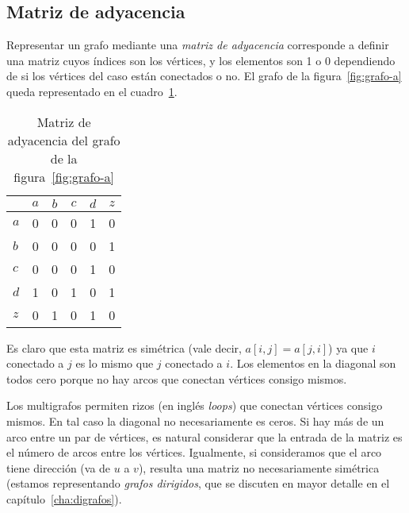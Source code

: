 \subsection{Matriz de adyacencia}
\label{sec:matriz-adyacencia}

  Representar un grafo mediante una \emph{matriz de adyacencia}
  corresponde a definir una matriz cuyos índices son los vértices,
  y los elementos son 1 o 0 dependiendo de si los vértices del caso
  están conectados o no.
  El grafo de la figura~\ref{fig:grafo-a}
  queda representado en el cuadro~\ref{tab:ma-grafo-a}.
  \begin{table}[htbp]
    \centering
    \begin{tabular}{l|*{5}{c}}
	  & $a$ & $b$ & $c$ & $d$ & $z$ \\
      \hline
	\rule[-0.7ex]{0pt}{3ex}%
      $a$ &   0 &   0 &	  0 &	1 &   0 \\
      $b$ &   0 &   0 &	  0 &	0 &   1 \\
      $c$ &   0 &   0 &	  0 &	1 &   0 \\
      $d$ &   1 &   0 &	  1 &	0 &   1 \\
      $z$ &   0 &   1 &	  0 &	1 &   0
    \end{tabular}
    \caption{Matriz de adyacencia
	     del grafo de la figura~\ref{fig:grafo-a}}
    \label{tab:ma-grafo-a}
  \end{table}
  Es claro que esta matriz es simétrica
  (vale decir,
   \(a[i, j] = a[j, i]\))
  ya que \(i\) conectado a \(j\)
  es lo mismo que \(j\) conectado a \(i\).
  Los elementos en la diagonal son todos cero
  porque no hay arcos que conectan vértices consigo mismos.

  Los multigrafos permiten rizos%
  (en inglés \emph{\foreignlanguage{english}{loops}})%
  que conectan vértices consigo mismos.
  En tal caso la diagonal no necesariamente es ceros.
  Si hay más de un arco entre un par de vértices,
  es natural considerar que la entrada de la matriz
  es el número de arcos entre los vértices.
  Igualmente,
  si consideramos que el arco tiene dirección
  (va de \(u\) a \(v\)),
  resulta una matriz no necesariamente simétrica
  (estamos representando \emph{grafos dirigidos},%
   que se discuten en mayor detalle
   en el capítulo~\ref{cha:digrafos}).

